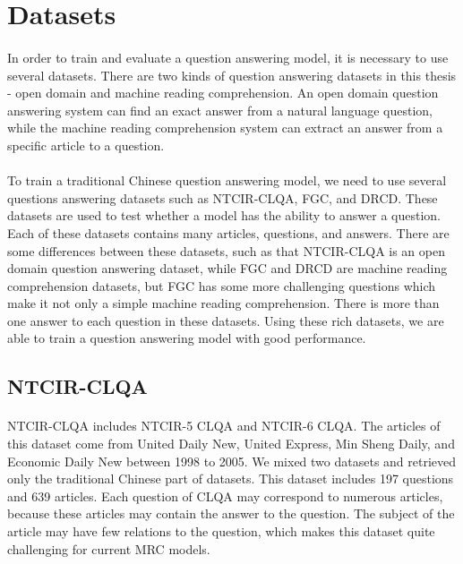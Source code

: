 \documentclass{article}
\begin{document}
\section{Datasets}
\paragraph{}
In order to train and evaluate a question answering model, it is necessary to use several datasets. There are two kinds of question answering datasets in this thesis - open domain and machine reading comprehension. An open domain question answering system can find an exact answer from a natural language question, while the machine reading comprehension system can extract an answer from a specific article to a question.
\paragraph{}
To train a traditional Chinese question answering model, we need to use several questions answering datasets such as NTCIR-CLQA, FGC, and DRCD. These datasets are used to test whether a model has the ability to answer a question. Each of these datasets contains many articles, questions, and answers. There are some differences between these datasets, such as that NTCIR-CLQA is an open domain question answering dataset, while FGC and DRCD are machine reading comprehension datasets, but FGC has some more challenging questions which make it not only a simple machine reading comprehension. There is more than one answer to each question in these datasets. Using these rich datasets, we are able to train a question answering model with good performance.


\subsection{NTCIR-CLQA}
\paragraph{}
NTCIR-CLQA includes NTCIR-5 CLQA\cite{sasaki2005ntcir5} and NTCIR-6\cite{sasaki2005ntcir6} CLQA. The articles of this dataset come from United Daily New, United Express, Min Sheng Daily, and Economic Daily New between 1998 to 2005. We mixed two datasets and retrieved only the traditional Chinese part of datasets. This dataset includes 197 questions and 639 articles. Each question of CLQA may correspond to numerous articles, because these articles may contain the answer to the question. The subject of the article may have few relations to the question, which makes this dataset quite challenging for current MRC models.
\end{document}
